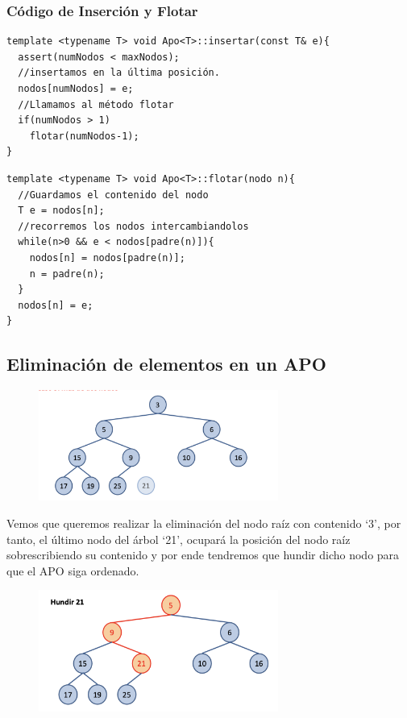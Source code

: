 \subsubsection*{Código de Inserción y Flotar}

\begin{verbatim}
template <typename T> void Apo<T>::insertar(const T& e){
  assert(numNodos < maxNodos);
  //insertamos en la última posición.
  nodos[numNodos] = e; 
  //Llamamos al método flotar
  if(numNodos > 1)
    flotar(numNodos-1);
}
  \end{verbatim}
\begin{verbatim}
template <typename T> void Apo<T>::flotar(nodo n){
  //Guardamos el contenido del nodo
  T e = nodos[n];
  //recorremos los nodos intercambiandolos
  while(n>0 && e < nodos[padre(n)]){
    nodos[n] = nodos[padre(n)];
    n = padre(n);
  }
  nodos[n] = e;
}
\end{verbatim}

\subsection*{Eliminación de elementos en un APO}
\begin{figure}[h]
  \begin{center}
    \includegraphics[width=0.7\textwidth]{assets/apo4.png}
  \end{center}
\end{figure}

Vemos que queremos realizar la eliminación del nodo raíz con contenido `3', por tanto, el último nodo del árbol `21', ocupará la posición del nodo raíz sobrescribiendo su contenido y por ende tendremos que hundir dicho nodo para que el APO siga ordenado.
\begin{figure}[h]
  \begin{center}
    \includegraphics[width=0.7\textwidth]{assets/apo5.png}
  \end{center}
\end{figure}

